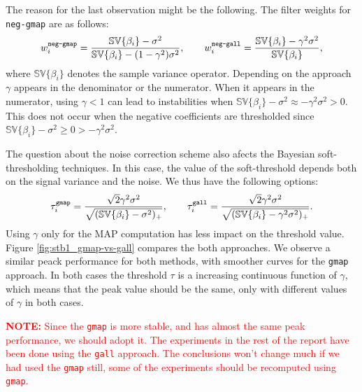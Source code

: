 \documentclass{ipol}
\begin{document}
The reason for the last observation might be the following. The filter weights
for \verb+neg-gmap+ are as follows:
\[
	w_i^{\text{\texttt{neg-gmap}}} = 
	\frac{\mathbb{SV}\{\beta_{i}\} - \sigma^2}
	     {\mathbb{SV}\{\beta_{i}\} - (1-\gamma^2)\sigma^2},
	\quad\quad 
	w_i^{\text{\texttt{neg-gall}}} = 
	\frac{\mathbb{SV}\{\beta_{i}\} - \gamma^2\sigma^2}
	     {\mathbb{SV}\{\beta_{i}\}},
\]
where $\mathbb{SV}\{\beta_{i}\}$ denotes the sample variance operator.
Depending on the approach $\gamma$ appears in the denominator or the numerator. 
When it appears in the numerator, using $\gamma < 1$ can lead to instabilities when
$\mathbb{SV}\{\beta_{i}\} -\sigma^2 \approx -\gamma^2\sigma^2 > 0$.
This does not occur when the negative coefficients are thresholded since 
$\mathbb{SV}\{\beta_{i}\} -\sigma^2 \geqslant 0 > -\gamma^2\sigma^2$.

The question about the noise correction scheme also afects the Bayesian
soft-thresholding techniques. In this case, the value of the soft-threshold
depends both on the signal variance and the noise. We thus have the following
options:
\[
	\tau_i^{\text{\texttt{gmap}}} = 
	\frac{\sqrt{2}\gamma^2\sigma^2}{\sqrt{(\mathbb{SV}\{\beta_{i}\} - \sigma^2)_+}},
	\quad\quad 
	\tau_i^{\text{\texttt{gall}}} = 
	\frac{\sqrt{2}\gamma^2\sigma^2}{\sqrt{(\mathbb{SV}\{\beta_{i}\} - \gamma^2\sigma^2)_+}}.
\]
Using $\gamma$ only for the MAP computation has less impact on the threshold value.
Figure \ref{fig:stb1_gmap-vs-gall} compares the both approaches. We observe a similar
peack performance for both methods, with smoother curves for the \texttt{gmap} approach.
In both cases the threshold $\tau$ is a increasing continuous function of $\gamma$, which
means that the peak value should be the same, only with different values of
$\gamma$ in both cases.

\textcolor{red}{\textbf{NOTE:} Since the \texttt{gmap} is more stable, and has almost
the same peak performance, we should adopt it. The experiments in the rest of
the report have been done using the \texttt{gall} approach. The conclusions
won't change much if we had used the \texttt{gmap} still,  
some of the experiments should be recomputed using
\texttt{gmap}.} 




\clearpage
\end{document}
